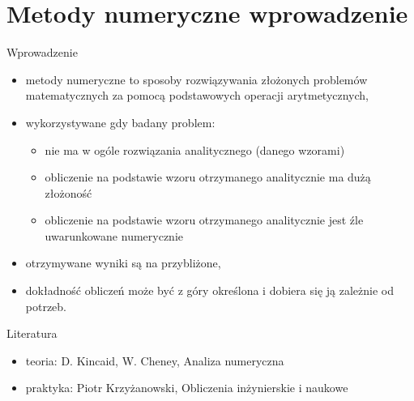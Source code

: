\section{Metody numeryczne wprowadzenie}
\begin{frame}{Wprowadzenie}

	\begin{itemize}
		\item metody numeryczne to sposoby rozwiązywania złożonych problemów matematycznych za pomocą podstawowych operacji arytmetycznych,
		\item wykorzystywane gdy badany problem:
		\begin{itemize}
		    \item 	nie ma w ogóle rozwiązania analitycznego (danego 
		    wzorami)
		    \item obliczenie na podstawie wzoru otrzymanego analitycznie ma dużą złożoność
		    \item obliczenie na podstawie wzoru otrzymanego analitycznie  jest źle uwarunkowane numerycznie
		\end{itemize}
	\item otrzymywane  wyniki są na przybliżone, 
	\item dokładność obliczeń może być z góry określona i dobiera się ją zależnie od potrzeb. 
	\end{itemize}
     
\end{frame}
\begin{frame}{Literatura}

	\begin{itemize}
		     \item teoria: D. Kincaid, W. Cheney, Analiza numeryczna
		     \item praktyka: Piotr Krzyżanowski, Obliczenia inżynierskie i naukowe
		   
	\end{itemize}
     
\end{frame}